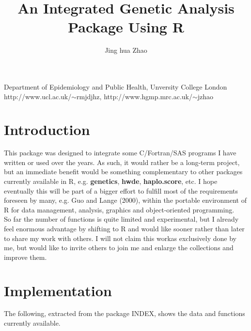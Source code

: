 \documentclass[10pt,a4paper]{article}
\begin{document}
\title{An Integrated Genetic Analysis Package Using R}

\author{Jing hua Zhao}
\date{}
\maketitle

\begin{center}
Department of Epidemiology and Public Health, Unversity College London\\
http://www.ucl.ac.uk/$\sim$rmjdjhz, http://www.hgmp.mrc.ac.uk/$\sim$jzhao
\end{center}

\tableofcontents



\section{Introduction}

This package was designed to integrate some C/Fortran/SAS programs I have written 
or used over the years. As such, it would rather be a long-term project, but an
immediate benefit would be something complementary to other packages currently
available in R, e.g. {\bf genetics}, {\bf hwde}, {\bf haplo.score}, etc. I hope
eventually this will be part of a bigger effort to fulfill most of the requirements
foreseen by many, e.g. Guo and Lange (2000), within the portable environment of R
for data management, analysis, graphics and object-oriented programming. \\

So far the number of functions is quite limited and experimental, but I already
feel enormous advantage by shifting to R and would like sooner rather than later
to share my work with others. I will not claim this workas exclusively done by
me, but would like to invite others to join me and enlarge the collections and
improve them.


\section{Implementation}

The following, extracted from the package INDEX, shows the data and functions
currently available.
\end{document}
